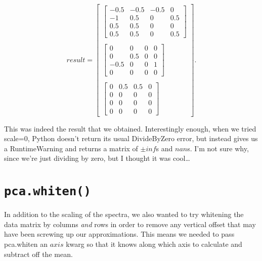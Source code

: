 \documentclass{article}
\begin{document}
\[result= \left[ \begin{array}{c}

    \left[\begin{array}{cccc}
        -0.5 & -0.5 & -0.5 & 0 \\
        -1 & 0.5 & 0 & 0.5 \\
        0.5 & 0.5 & 0 & 0 \\
        0.5 & 0.5 & 0 & 0.5
      \end{array} \right] \\

    \\

    \left[\begin{array}{cccc}
        0 & 0 & 0 & 0 \\
        0 & 0.5 & 0 & 0 \\
        -0.5 & 0 & 0 & 1 \\
        0 & 0 & 0 & 0
      \end{array} \right] \\

    \\

    \left[\begin{array}{cccc}
        0 & 0.5 & 0.5 & 0 \\
        0 & 0 & 0 & 0 \\
        0 & 0 & 0 & 0 \\
        0 & 0 & 0 & 0
      \end{array} \right]

\end{array} \right]. \]

This was indeed the result that we obtained.  Interestingly enough,
when we tried scale=0, Python doesn't return its usual DivideByZero
error, but instead gives us a RuntimeWarning and returns a matrix of
$\pm inf$s and $nan$s.  I'm not sure why, since we're just dividing by
zero, but I thought it was cool\ldots 


\section{\texttt{pca.whiten()}}
\label{sec:whiten}

In addition to the scaling of the spectra, we also wanted to try
whitening the data matrix by columns \emph{and} rows in order to
remove any vertical offset that may have been screwing up our
approximations.  This means we needed to pass pca.whiten an $axis$
kwarg so that it knows along which axis to calculate and subtract off
the mean.
\end{document}
